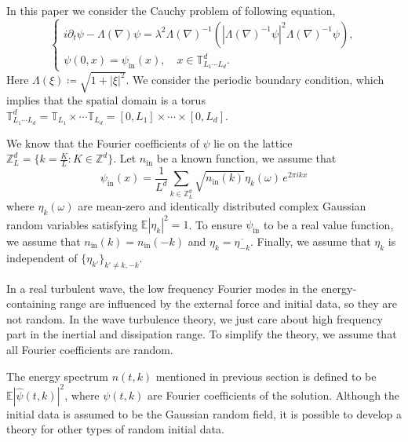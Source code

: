 In this paper we consider the Cauchy problem of
following equation,
\begin{equation}\tag{NKLG}\label{eq.NKLG}
\begin{cases}
i\partial_t\psi-\Lambda(\nabla)\psi=\lambda^2 \Lambda(\nabla)^{-1}\left(|\Lambda(\nabla)^{-1}\psi|^2\Lambda(\nabla)^{-1}\psi\right),\\[.6em]
\psi(0,x) = \psi_{\textrm{in}}(x), \quad x\in \mathbb{T}^d_{L_1\cdots L_d}.
\end{cases}    
\end{equation}
Here $\Lambda(\xi)\coloneqq\sqrt{1+|\xi|^2}$. We consider the periodic boundary condition, which implies that the spatial domain is a torus $\mathbb{T}^d_{L_1\cdots L_d}=\mathbb{T}_{L_1}\times\cdots\mathbb{T}_{L_d}=[0,L_1]\times\cdots\times [0,L_d]$.

We know that the Fourier coefficients of $\psi$ lie on the lattice $\mathbb{Z}_L^d = \{k=\frac{K}{L}:K\in \mathbb{Z}^d\}$. Let $n_{\textrm{in}}$ be a known function, we assume that
\begin{equation}\label{eq.wellprepared}
\psi_{\textrm{in}}(x)=\frac{1}{L^d}\sum_{k\in\mathbb{Z}^d_L}\sqrt{n_{\textrm{in}}(k)} \eta_k(\omega)\,  e^{2\pi i kx}
\end{equation}
where $\eta_k(\omega)$ are mean-zero and identically distributed complex Gaussian random variables satisfying $\mathbb E |\eta_k|^2=1$. To ensure $\psi_{\textrm{in}}$ to be a real value function, we assume that $n_{\textrm{in}}(k)=n_{\textrm{in}}(-k)$ and $\eta_k=\overline{\eta_{-k}}$. Finally, we assume that $\eta_k$ is independent of $\{\eta_{k'}\}_{k'\ne k,-k}$.

In a real turbulent wave, the low frequency Fourier modes in the energy-containing range are influenced by the external force and initial data, so they are not random. In the wave turbulence theory, we just care about high frequency part in the inertial and dissipation range. To simplify the theory, we assume that all Fourier coefficients are random.


The energy spectrum $n(t,k)$ mentioned in previous section is defined to be $\mathbb E |\widehat \psi(t, k)|^2$, where $\psi(t, k)$ are Fourier coefficients of the solution. Although the initial data is assumed to be the Gaussian random field, it is possible to develop a theory for other types of random initial data.



